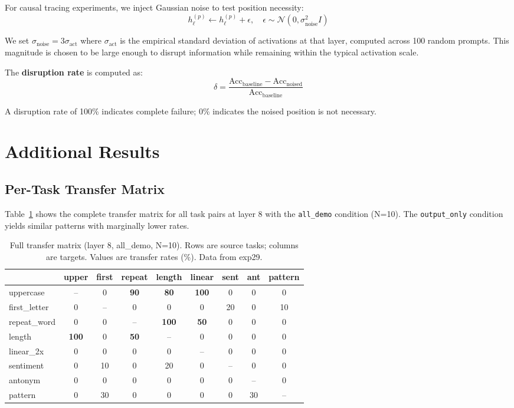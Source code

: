 \documentclass[runningheads]{llncs}
\begin{document}
For causal tracing experiments, we inject Gaussian noise to test position necessity:
\begin{equation}
    h_\ell^{(p)} \leftarrow h_\ell^{(p)} + \epsilon, \quad \epsilon \sim \mathcal{N}(0, \sigma_\text{noise}^2 I)
\end{equation}

We set $\sigma_\text{noise} = 3\sigma_\text{act}$ where $\sigma_\text{act}$ is the empirical standard deviation of activations at that layer, computed across 100 random prompts. This magnitude is chosen to be large enough to disrupt information while remaining within the typical activation scale.

The \textbf{disruption rate} is computed as:
\begin{equation}
    \delta = \frac{\text{Acc}_\text{baseline} - \text{Acc}_\text{noised}}{\text{Acc}_\text{baseline}}
\end{equation}

A disruption rate of 100\% indicates complete failure; 0\% indicates the noised position is not necessary.

\section{Additional Results}
\label{app:results}

\subsection{Per-Task Transfer Matrix}

Table~\ref{tab:full_transfer} shows the complete transfer matrix for all task pairs at layer 8 with the \texttt{all\_demo} condition (N=10). The \texttt{output\_only} condition yields similar patterns with marginally lower rates.

\begin{table}[h]
\centering
\caption{Full transfer matrix (layer 8, all\_demo, N=10). Rows are source tasks; columns are targets. Values are transfer rates (\%). Data from exp29.}
\label{tab:full_transfer}
\begin{tabular}{@{}lcccccccc@{}}
\toprule
& upper & first & repeat & length & linear & sent & ant & pattern \\
\midrule
uppercase & -- & 0 & \textbf{90} & \textbf{80} & \textbf{100} & 0 & 0 & 0 \\
first\_letter & 0 & -- & 0 & 0 & 0 & 20 & 0 & 10 \\
repeat\_word & 0 & 0 & -- & \textbf{100} & \textbf{50} & 0 & 0 & 0 \\
length & \textbf{100} & 0 & \textbf{50} & -- & 0 & 0 & 0 & 0 \\
linear\_2x & 0 & 0 & 0 & 0 & -- & 0 & 0 & 0 \\
sentiment & 0 & 10 & 0 & 20 & 0 & -- & 0 & 0 \\
antonym & 0 & 0 & 0 & 0 & 0 & 0 & -- & 0 \\
pattern & 0 & 30 & 0 & 0 & 0 & 0 & 30 & -- \\
\bottomrule
\end{tabular}
\end{table}
\end{document}
